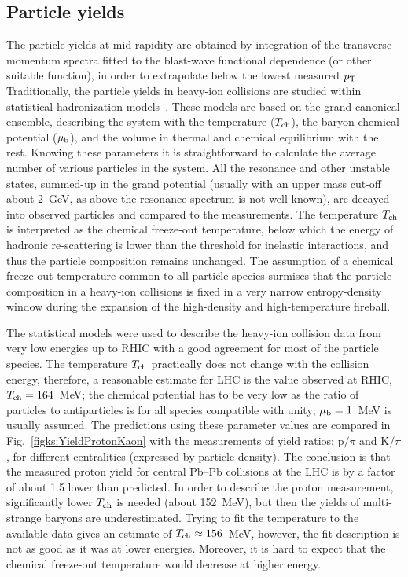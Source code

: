 \subsection{Particle yields}
\label{subsecks:yields}
The particle yields at mid-rapidity are obtained by integration of the transverse-momentum spectra fitted to the blast-wave functional dependence (or other suitable function), in order to extrapolate below the lowest measured $p_{\rm T}$. Traditionally, the particle yields in heavy-ion collisions are studied within statistical hadronization models~\cite{Andronic:2008gu,Andronic:2011yq,Cleymans:1998fq,Becattini:2009fv}. These models are based on the grand-canonical ensemble, describing the system with the temperature ($T_{\rm ch}$), the baryon chemical potential ($\mu_{\rm b}$), and the volume in thermal and chemical equilibrium with the rest. Knowing these parameters it is straightforward to calculate the average number of various particles in the system. All the resonance and other unstable states, summed-up in the grand potential (usually with an upper mass cut-off about $2$~GeV, as above the resonance spectrum is not well known), are decayed into observed particles and compared to the measurements. The temperature $T_{\rm ch}$ is interpreted as the chemical freeze-out temperature, below which the energy of hadronic re-scattering is lower than the threshold for inelastic interactions, and thus the particle composition remains unchanged. The assumption of a chemical freeze-out temperature common to all particle species surmises that the particle composition in a heavy-ion collisions is fixed in a very narrow entropy-density window during the expansion of the high-density and high-temperature fireball.

The statistical models were used to describe the heavy-ion collision data from very low energies up to RHIC with a good agreement for most of the particle species. The temperature $T_{\rm ch}$ practically does not change with the collision energy, therefore, a reasonable estimate for LHC is the value observed at RHIC, $T_{\rm ch} = 164$~MeV; the chemical potential has to be very low as the ratio of particles to antiparticles is for all species compatible with unity; $\mu_{\rm b} = 1$~MeV is usually assumed. The predictions using these parameter values are compared in Fig.~\ref{figks:YieldProtonKaon} with the measurements of yield ratios: p$/\pi$ and K$/\pi$, for different centralities (expressed by particle density). The conclusion is that the measured proton yield for central Pb--Pb collisions at the LHC is by a factor of about 1.5 lower than predicted. In order to describe the proton measurement, significantly lower $T_{\rm ch}$ is needed (about 152~MeV), but then the yields of multi-strange baryons are underestimated. Trying to fit the temperature to the available data gives an estimate of $T_{\rm ch} \approx 156$~MeV, however, the fit description is not as good as it was at lower energies. Moreover, it is hard to expect that the chemical freeze-out temperature would decrease at higher energy.

